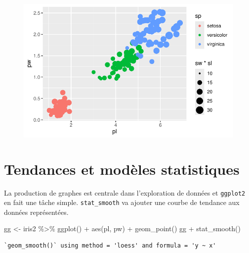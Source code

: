 \documentclass[
  letterpaper,
  DIV=11,
  numbers=noendperiod]{scrreprt}
\newenvironment{Shaded}{\begin{snugshade}}{\end{snugshade}}
\newcommand{\FunctionTok}[1]{\textcolor[rgb]{0.28,0.35,0.67}{#1}}
\newcommand{\NormalTok}[1]{\textcolor[rgb]{0.00,0.23,0.31}{#1}}
\newcommand{\OtherTok}[1]{\textcolor[rgb]{0.00,0.23,0.31}{#1}}
\newcommand{\SpecialCharTok}[1]{\textcolor[rgb]{0.37,0.37,0.37}{#1}}
\begin{document}
\begin{figure}[H]

{\centering \includegraphics{ggplot2_files/figure-pdf/unnamed-chunk-6-1.pdf}

}

\end{figure}

\hypertarget{tendances-et-moduxe8les-statistiques}{%
\section{Tendances et modèles
statistiques}\label{tendances-et-moduxe8les-statistiques}}

La production de graphes est centrale dans l'exploration de données et
\texttt{ggplot2} en fait une tâche simple. \texttt{stat\_smooth} va
ajouter une courbe de tendance aux données représentées.

\begin{Shaded}
\begin{Highlighting}[]
\NormalTok{gg }\OtherTok{\textless{}{-}}\NormalTok{ iris2 }\SpecialCharTok{\%\textgreater{}\%} \FunctionTok{ggplot}\NormalTok{() }\SpecialCharTok{+} \FunctionTok{aes}\NormalTok{(pl, pw) }\SpecialCharTok{+} \FunctionTok{geom\_point}\NormalTok{() }
\NormalTok{gg }\SpecialCharTok{+} \FunctionTok{stat\_smooth}\NormalTok{()}
\end{Highlighting}
\end{Shaded}

\begin{verbatim}
`geom_smooth()` using method = 'loess' and formula = 'y ~ x'
\end{verbatim}
\end{document}
